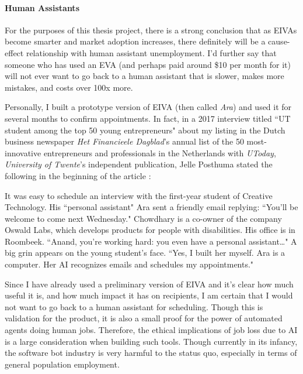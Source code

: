 \documentclass{article}
\begin{document}
\paragraph{Human Assistants}

For the purposes of this thesis project, there is a strong conclusion that as EIVAs become smarter and market adoption increases, there definitely will be a cause-effect relationship with human assistant unemployment. I'd further say that someone who has used an EVA (and perhaps paid around \$10 per month for it) will not ever want to go back to a human assistant that is slower, makes more mistakes, and costs over 100x more.

Personally, I built a prototype version of EIVA (then called \emph{Ara}) and used it for several months to confirm appointments. In fact, in a 2017 interview titled ``UT student among the top 50 young entrepreneurs" about my listing in the Dutch business newspaper \emph{Het Financieele Dagblad}'s annual list of the 50 most-innovative entrepreneurs and professionals in the Netherlands with \emph{UToday}, \emph{University of Twente}'s independent publication, Jelle Posthuma stated the following in the beginning of the article \cite{noauthor_ut_nodate}:

\begin{displayquote}
It was easy to schedule an interview with the first-year student of Creative Technology. His ``personal assistant" Ara sent a friendly email replying: ``You’ll be welcome to come next Wednesday." Chowdhary is a co-owner of the company Oswald Labs, which develops products for people with disabilities. His office is in Roombeek. ``Anand, you’re working hard: you even have a personal assistant…" A big grin appears on the young student’s face. ``Yes, I built her myself. Ara is a computer. Her AI recognizes emails and schedules my appointments."
\end{displayquote}

Since I have already used a preliminary version of EIVA and it's clear how much useful it is, and how much impact it has on recipients, I am certain that I would not want to go back to a human assistant for scheduling. Though this is validation for the product, it is also a small proof for the power of automated agents doing human jobs. Therefore, the ethical implications of job loss due to AI is a large consideration when building such tools. Though currently in its infancy, the software bot industry is very harmful to the status quo, especially in terms of general population employment.
\end{document}
